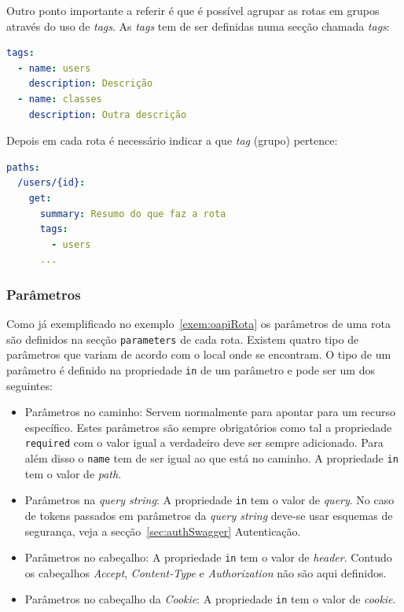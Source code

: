 Outro ponto importante a referir é que é possível agrupar as rotas em grupos através do uso de \textit{tags}. As \textit{tags} tem de ser definidas numa secção chamada \textit{tags}:
\begin{lstlisting}[language=yaml, caption={Exemplo de secção \texttt{tags} defininfo tags na especificação \textit{OpenAPI}}]
tags:
  - name: users
    description: Descrição
  - name: classes
    description: Outra descrição
\end{lstlisting}

Depois em cada rota é necessário indicar a que \textit{tag} (grupo) pertence:
\begin{lstlisting}[language=yaml, caption=Exemplo de uso de \textit{tags} numa rota na especificação \textit{OpenAPI}]
paths:
  /users/{id}:
    get:
      summary: Resumo do que faz a rota
      tags:
        - users
      ...
\end{lstlisting}

\subsubsection{Parâmetros}\label{sec:paramSwagger}
Como já exemplificado no exemplo~\ref{exem:oapiRota} os parâmetros de uma rota são definidos na secção \texttt{parameters} de cada rota. Existem quatro tipo de parâmetros que variam de acordo com o local onde se encontram. O tipo de um parâmetro é definido na propriedade \texttt{in} de um parâmetro e pode ser um dos seguintes:
\begin{itemize}
    \item Parâmetros no caminho: Servem normalmente para apontar para um recurso específico. Estes parâmetros são sempre obrigatórios como tal a propriedade \texttt{required} com o valor igual a verdadeiro deve ser sempre adicionado. Para além disso o \texttt{name} tem de ser igual ao que está no caminho. A propriedade \texttt{in} tem o valor de \textit{path}.
    \item Parâmetros na \textit{query string}: A propriedade \texttt{in} tem o valor de \textit{query}. No caso de tokens passados em parâmetros da \textit{query string} deve-se usar esquemas de segurança, veja a secção~\ref{sec:authSwagger} Autenticação.
    \item Parâmetros no cabeçalho: A propriedade \texttt{in} tem o valor de \textit{header}. Contudo os cabeçalhos \textit{Accept}, \textit{Content-Type} e \textit{Authorization} não são aqui definidos.
    \item Parâmetros no cabeçalho da \textit{Cookie}: A propriedade \texttt{in} tem o valor de \textit{cookie}.
\end{itemize}

